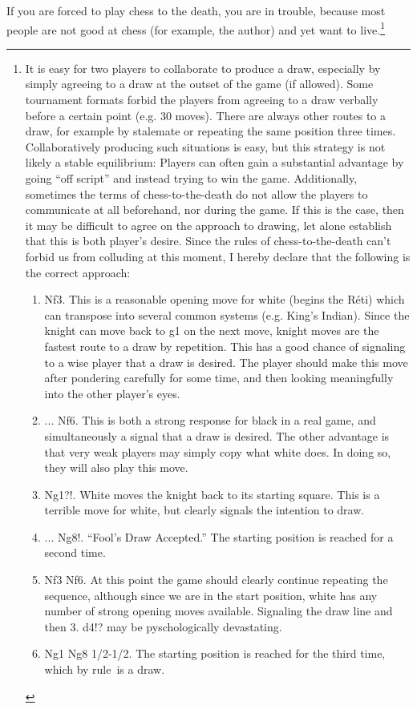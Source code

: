 \documentclass[twocolumn]{article}
\begin{document}
If you are forced to play chess to the death, you are in trouble,
because most people are not good at chess (for example, the author)
and yet want to live.\footnote{It is easy for two players to
  collaborate to produce a draw, especially by simply agreeing to a
  draw at the outset of the game (if allowed). Some tournament formats
  forbid the players from agreeing to a draw verbally before a certain
  point (e.g. 30 moves). There are always other routes to a draw, for
  example by stalemate or repeating the same position three times.
  Collaboratively producing such situations is easy, but this strategy
  is not likely a stable equilibrium: Players can often gain a
  substantial advantage by going ``off script'' and instead trying to
  win the game. Additionally, sometimes the terms of
  chess-to-the-death do not allow the players to communicate at all
  beforehand, nor during the game. If this is the case, then it may be
  difficult to agree on the approach to drawing, let alone establish
  that this is both player's desire. Since the rules of
  chess-to-the-death can't forbid us from colluding at this moment, I
  hereby declare that the following is the correct approach: 
\begin{enumerate}[label=\arabic*.]
  \item[1.] Nf3. This is a reasonable opening move for white (begins the R\'eti)
    which can transpose into several common systems (e.g. King's
    Indian). Since the knight can move back to g1 on the next move,
    knight moves are the fastest route to a draw by repetition. This
    has a good chance of signaling to a wise player that a draw is
    desired. The player should make this move after pondering carefully
    for some time, and then looking meaningfully into the other player's
    eyes. 
  \item[1.] ... Nf6. This is both a strong response for black in a real game,
    and simultaneously a signal that a draw is desired. The other
    advantage is that very weak players may simply copy what white does.
    In doing so, they will also play this move. 
  \item[2.] Ng1?!. White moves the knight back to its starting square.
    This is a terrible move for white, but clearly signals the intention to
    draw.
  \item[2.] ... Ng8!. ``Fool's Draw Accepted.'' The starting position is reached
    for a second time.
  \item[3.] Nf3 Nf6. At this point the game should clearly continue repeating
    the sequence, although since we are in the start position, white has
    any number of strong opening moves available. Signaling the draw line
    and then 3. d4!? may be pyschologically devastating.
  \item[4.] Ng1 Ng8 1/2-1/2. The starting position is reached for the third
    time, which by rule\footnotemark\ is a draw.
\end{enumerate}

}
\end{document}
